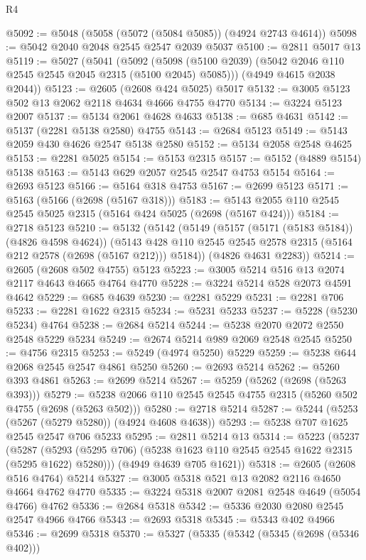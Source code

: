 \begin{lexlean}{R4}
\begin{coremodule}
@5092 := @5048 (@5058 (@5072 (@5084 @5085)) (@4924 @2743 @4614))
@5098 := @5042 @2040 @2048 @2545 @2547 @2039 @5037
@5100 := @2811 @5017 @13
@5119 := @5027
    (@5041
      (@5092 (@5098 (@5100 @2039) (@5042 @2046 @110 @2545 @2545 @2045 @2315 (@5100 @2045) @5085)))
      (@4949 @4615 @2038 @2044))
@5123 := @2605 (@2608 @424 @5025) @5017
@5132 := @3005 @5123 @502 @13 @2062 @2118 @4634 @4666 @4755 @4770
@5134 := @3224 @5123 @2007
@5137 := @5134 @2061 @4628 @4633
@5138 := @685 @4631
@5142 := @5137 (@2281 @5138 @2580) @4755
@5143 := @2684 @5123
@5149 := @5143 @2059 @430 @4626 @2547 @5138 @2580
@5152 := @5134 @2058 @2548 @4625
@5153 := @2281 @5025
@5154 := @5153 @2315
@5157 := @5152 (@4889 @5154) @5138
@5163 := @5143 @629 @2057 @2545 @2547 @4753 @5154
@5164 := @2693 @5123
@5166 := @5164 @318 @4753
@5167 := @2699 @5123
@5171 := @5163 (@5166 (@2698 (@5167 @318)))
@5183 := @5143 @2055 @110 @2545 @2545 @5025 @2315 (@5164 @424 @5025 (@2698 (@5167 @424)))
@5184 := @2718 @5123
@5210 := @5132
    (@5142
      (@5149
        (@5157 (@5171 (@5183 @5184)) (@4826 @4598 @4624))
        (@5143 @428 @110 @2545 @2545 @2578 @2315 (@5164 @212 @2578 (@2698 (@5167 @212))) @5184))
      (@4826 @4631 @2283))
@5214 := @2605 (@2608 @502 @4755) @5123
@5223 := @3005 @5214 @516 @13 @2074 @2117 @4643 @4665 @4764 @4770
@5228 := @3224 @5214 @528 @2073 @4591 @4642
@5229 := @685 @4639
@5230 := @2281 @5229
@5231 := @2281 @706
@5233 := @2281 @1622 @2315
@5234 := @5231 @5233
@5237 := @5228 (@5230 @5234) @4764
@5238 := @2684 @5214
@5244 := @5238 @2070 @2072 @2550 @2548 @5229 @5234
@5249 := @2674 @5214 @989 @2069 @2548 @2545
@5250 := @4756 @2315
@5253 := @5249 (@4974 @5250) @5229
@5259 := @5238 @644 @2068 @2545 @2547 @4861 @5250
@5260 := @2693 @5214
@5262 := @5260 @393 @4861
@5263 := @2699 @5214
@5267 := @5259 (@5262 (@2698 (@5263 @393)))
@5279 := @5238 @2066 @110 @2545 @2545 @4755 @2315 (@5260 @502 @4755 (@2698 (@5263 @502)))
@5280 := @2718 @5214
@5287 := @5244 (@5253 (@5267 (@5279 @5280)) (@4924 @4608 @4638))
@5293 := @5238 @707 @1625 @2545 @2547 @706 @5233
@5295 := @2811 @5214 @13
@5314 := @5223
    (@5237
      (@5287 (@5293 (@5295 @706) (@5238 @1623 @110 @2545 @2545 @1622 @2315 (@5295 @1622) @5280)))
      (@4949 @4639 @705 @1621))
@5318 := @2605 (@2608 @516 @4764) @5214
@5327 := @3005 @5318 @521 @13 @2082 @2116 @4650 @4664 @4762 @4770
@5335 := @3224 @5318 @2007 @2081 @2548 @4649 (@5054 @4766) @4762
@5336 := @2684 @5318
@5342 := @5336 @2030 @2080 @2545 @2547 @4966 @4766
@5343 := @2693 @5318
@5345 := @5343 @402 @4966
@5346 := @2699 @5318
@5370 := @5327
    (@5335
      (@5342
        (@5345 (@2698 (@5346 @402)))

\end{coremodule}
\end{lexlean}
